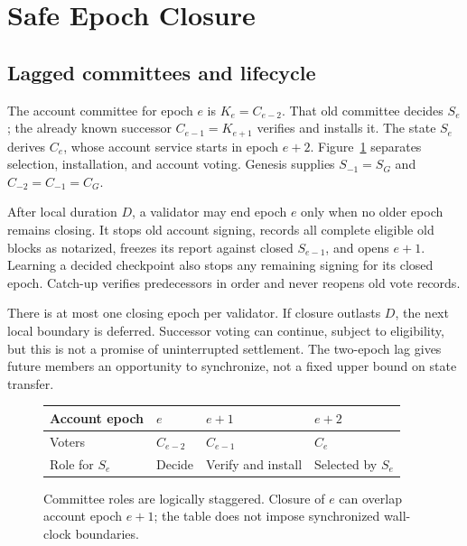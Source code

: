 \section{Safe Epoch Closure}
\label{sec:closure}
\subsection{Lagged committees and lifecycle}
The account committee for epoch $e$ is $K_e=C_{e-2}$. That old committee decides $S_e$; the already known successor $C_{e-1}=K_{e+1}$ verifies and installs it. The state $S_e$ derives $C_e$, whose account service starts in epoch $e+2$. Figure~\ref{fig:committees} separates selection, installation, and account voting. Genesis supplies $S_{-1}=S_G$ and $C_{-2}=C_{-1}=C_G$.

After local duration $D$, a validator may end epoch $e$ only when no older epoch remains closing. It stops old account signing, records all complete eligible old blocks as notarized, freezes its report against closed $S_{e-1}$, and opens $e+1$. Learning a decided checkpoint also stops any remaining signing for its closed epoch. Catch-up verifies predecessors in order and never reopens old vote records.

There is at most one closing epoch per validator. If closure outlasts $D$, the next local boundary is deferred. Successor voting can continue, subject to eligibility, but this is not a promise of uninterrupted settlement. The two-epoch lag gives future members an opportunity to synchronize, not a fixed upper bound on state transfer.

\begin{figure}[t]
\centering
\begin{tabularx}{\columnwidth}{@{}lYYY@{}}
\toprule
Account epoch & $e$ & $e+1$ & $e+2$\\
\midrule
Voters & $C_{e-2}$ & $C_{e-1}$ & $C_e$\\
Role for $S_e$ & Decide & Verify and install & Selected by $S_e$\\
\bottomrule
\end{tabularx}
\caption{Committee roles are logically staggered. Closure of $e$ can overlap account epoch $e+1$; the table does not impose synchronized wall-clock boundaries.}
\label{fig:committees}
\end{figure}

